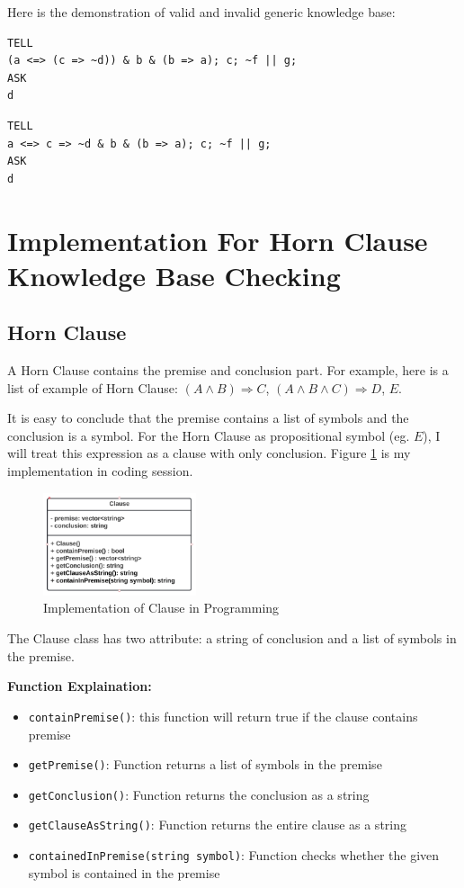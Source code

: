 \documentclass{assignment}
\begin{document}
Here is the demonstration of valid and invalid generic knowledge base:

\begin{lstlisting}[caption={Valid Input For Generic Knowledge Base}]
TELL
(a <=> (c => ~d)) & b & (b => a); c; ~f || g;
ASK
d
\end{lstlisting}

\begin{lstlisting}[caption={Invalid Input For Generic Knowledge Base}]
TELL
a <=> c => ~d & b & (b => a); c; ~f || g;
ASK
d
\end{lstlisting}



\section{Implementation For Horn Clause Knowledge Base Checking}

\subsection{Horn Clause}
A Horn Clause contains the premise and conclusion part. For example, here is a list of example of Horn Clause: $(A \land B) \Rightarrow C$, $(A \land B \land C) \Rightarrow D$, $E$.

It is easy to conclude that the premise contains a list of symbols and the conclusion is a symbol. For the Horn Clause as propositional symbol (eg. $E$), I will treat this expression as a clause with only conclusion. Figure \ref{fig:fig2} is my implementation in coding session.

\begin{figure}[h]
    \centering
    \includegraphics[width=0.4\textwidth]{./assets/Clause.png}
    \caption{Implementation of Clause in Programming}
    \label{fig:fig2}
\end{figure}

The Clause class has two attribute: a string of conclusion and a list of symbols in the premise.

\textbf{Function Explaination:}
\begin{itemize}
  \item \texttt{containPremise()}: this function will return true if the clause contains premise
  \item \texttt{getPremise()}: Function returns a list of symbols in the premise
  \item \texttt{getConclusion()}: Function returns the conclusion as a string
  \item \texttt{getClauseAsString()}: Function returns the entire clause as a string
\item \texttt{containedInPremise(string symbol)}: Function checks whether the given symbol is contained in the premise
  
\end{itemize}
\end{document}
